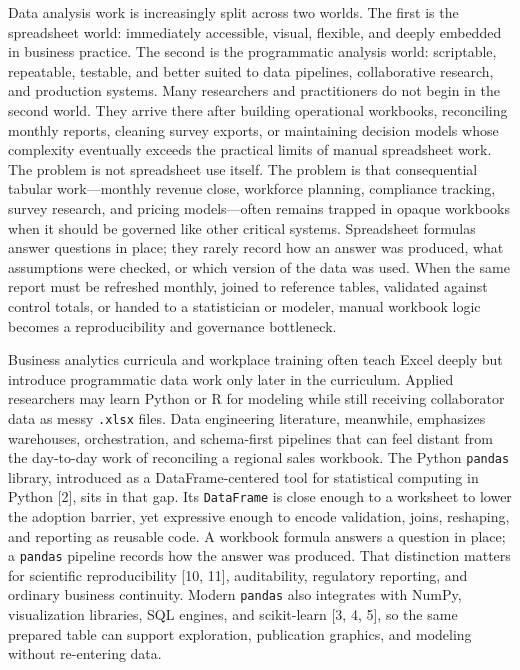 \documentclass[
  12pt,
]{article}
\begin{document}
Data analysis work is increasingly split across two worlds. The first is
the spreadsheet world: immediately accessible, visual, flexible, and
deeply embedded in business practice. The second is the programmatic
analysis world: scriptable, repeatable, testable, and better suited to
data pipelines, collaborative research, and production systems. Many
researchers and practitioners do not begin in the second world. They
arrive there after building operational workbooks, reconciling monthly
reports, cleaning survey exports, or maintaining decision models whose
complexity eventually exceeds the practical limits of manual spreadsheet
work. The problem is not spreadsheet use itself. The problem is that
consequential tabular work---monthly revenue close, workforce planning,
compliance tracking, survey research, and pricing models---often remains
trapped in opaque workbooks when it should be governed like other
critical systems. Spreadsheet formulas answer questions in place; they
rarely record how an answer was produced, what assumptions were checked,
or which version of the data was used. When the same report must be
refreshed monthly, joined to reference tables, validated against control
totals, or handed to a statistician or modeler, manual workbook logic
becomes a reproducibility and governance bottleneck.

Business analytics curricula and workplace training often teach Excel
deeply but introduce programmatic data work only later in the
curriculum. Applied researchers may learn Python or R for modeling while
still receiving collaborator data as messy \texttt{.xlsx} files. Data
engineering literature, meanwhile, emphasizes warehouses, orchestration,
and schema-first pipelines that can feel distant from the day-to-day
work of reconciling a regional sales workbook. The Python
\texttt{pandas} library, introduced as a DataFrame-centered tool for
statistical computing in Python {[}2{]}, sits in that gap. Its
\texttt{DataFrame} is close enough to a worksheet to lower the adoption
barrier, yet expressive enough to encode validation, joins, reshaping,
and reporting as reusable code. A workbook formula answers a question in
place; a \texttt{pandas} pipeline records how the answer was produced.
That distinction matters for scientific reproducibility {[}10, 11{]},
auditability, regulatory reporting, and ordinary business continuity.
Modern \texttt{pandas} also integrates with NumPy, visualization
libraries, SQL engines, and scikit-learn {[}3, 4, 5{]}, so the same
prepared table can support exploration, publication graphics, and
modeling without re-entering data.
\end{document}
